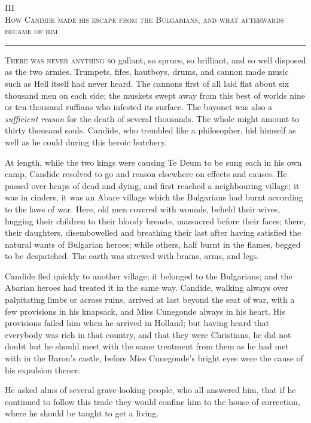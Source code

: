 \begin{center}
III\\
\textsc{How Candide made his escape from the Bulgarians, and what afterwards became of him}
\end{center}
\vspace{-0.5cm}
\rule{\textwidth}{0.5pt}
\lettrine{T}{here was never anything so} gallant, so spruce, so brilliant, and so well disposed as the two armies. Trumpets, fifes, hautboys, drums, and cannon made music such as Hell itself had never heard. The cannons first of all laid flat about six thousand men on each side; the muskets swept away from this best of worlds nine or ten thousand ruffians who infested its surface. The bayonet was also a \textit{sufficient reason} for the death of several thousands. The whole might amount to thirty thousand souls. Candide, who trembled like a philosopher, hid himself as well as he could during this heroic butchery.

At length, while the two kings were causing Te Deum to be sung each in his own camp, Candide resolved to go and reason elsewhere on effects and causes. He passed over heaps of dead and dying, and first reached a neighbouring village; it was in cinders, it was an Abare village which the Bulgarians had burnt according to the laws of war. Here, old men covered with wounds, beheld their wives, hugging their children to their bloody breasts, massacred before their faces; there, their daughters, disembowelled and breathing their last after having satisfied the natural wants of Bulgarian heroes; while others, half burnt in the flames, begged to be despatched. The earth was strewed with brains, arms, and legs.

Candide fled quickly to another village; it belonged to the Bulgarians; and the Abarian heroes had treated it in the same way. Candide, walking always over palpitating limbs or across ruins, arrived at last beyond the seat of war, with a few provisions in his knapsack, and Miss Cunegonde always in his heart. His provisions failed him when he arrived in Holland; but having heard that everybody was rich in that country, and that they were Christians, he did not doubt but he should meet with the same treatment from them as he had met with in the Baron's castle, before Miss Cunegonde's bright eyes were the cause of his expulsion thence.

He asked alms of several grave-looking people, who all answered him, that if he continued to follow this trade they would confine him to the house of correction, where he should be taught to get a living.

